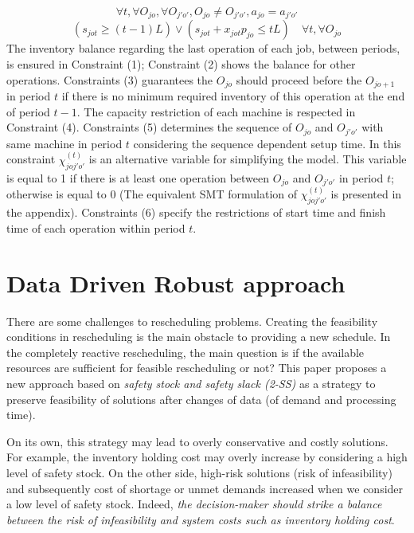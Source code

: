 \documentclass[letterpaper]{article} %
\begin{document}
$$\forall t, \forall O_{jo}, \forall O_{j'o'},
O_{jo}\neq O_{j'o'},a_{jo}=a_{j'o'}$$
\begin{equation}
(s_{jot} \geq (t-1)L) \vee  (s_{jot}+x_{jot}p_{jo} \leq tL) \quad  \forall t, \forall O_{jo}
\end{equation}
The inventory balance regarding the last operation of each job, between periods, is ensured in Constraint (1); Constraint (2) shows the balance for other operations. Constraints (3) guarantees the $O_{jo}$ should proceed before the $O_{jo+1}$ in period $t$ if there is no minimum required inventory of this operation at the end of period $t-1$. The capacity restriction of each machine is respected in Constraint (4). Constraints (5) determines the sequence of $O_{jo}$ and $O_{j'o'}$ with same machine in period $t$ considering the sequence dependent setup time. In this constraint $\chi_{joj'o'}^{(t)}$ is an alternative variable for simplifying the model. This variable is equal to 1 if there is at least one operation between $O_{jo}$ and $O_{j'o'}$ in period $t$; otherwise is equal to 0 (The equivalent SMT formulation of $\chi_{joj'o'}^{(t)}$ is presented in the appendix). Constraints (6) specify the restrictions of start time and finish time of each operation within period $t$.

\section{Data Driven Robust approach}
There are some challenges to rescheduling problems. Creating the feasibility conditions in rescheduling is the main obstacle to providing a new schedule. In the completely reactive rescheduling, the main question is if the available resources are sufficient for feasible rescheduling or not? This paper proposes a new approach based on \emph{safety stock and safety slack (2-SS)} as a strategy to preserve feasibility of solutions after changes of data (of demand and processing time).

On its own, this strategy may lead to overly conservative and costly solutions. For example, the inventory holding cost may overly increase by considering a high level of safety stock. On the other side, high-risk solutions (risk of infeasibility) and subsequently cost of shortage or unmet demands increased when we consider a low level of safety stock. Indeed, {\it the decision-maker should strike a balance between the risk of infeasibility and system costs such as inventory holding cost}.
%
\end{document}
